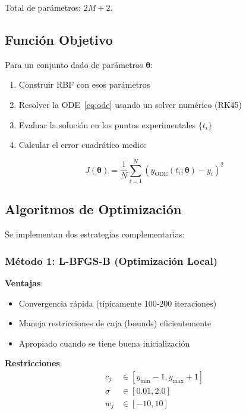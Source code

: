 \documentclass[11pt,a4paper]{article}
\begin{document}
Total de parámetros: $2M + 2$.

\subsection{Función Objetivo}

Para un conjunto dado de parámetros $\boldsymbol{\theta}$:

\begin{enumerate}
    \item Construir RBF con esos parámetros
    \item Resolver la ODE~\eqref{eq:ode} usando un solver numérico (RK45)
    \item Evaluar la solución en los puntos experimentales $\{t_i\}$
    \item Calcular el error cuadrático medio:
\end{enumerate}

\begin{equation}
J(\boldsymbol{\theta}) = \frac{1}{N}\sum_{i=1}^{N} \left( y_{\text{ODE}}(t_i; \boldsymbol{\theta}) - y_i \right)^2
\label{eq:objective}
\end{equation}

\subsection{Algoritmos de Optimización}

Se implementan dos estrategias complementarias:

\subsubsection{Método 1: L-BFGS-B (Optimización Local)}

\textbf{Ventajas}:
\begin{itemize}
    \item Convergencia rápida (típicamente 100-200 iteraciones)
    \item Maneja restricciones de caja (bounds) eficientemente
    \item Apropiado cuando se tiene buena inicialización
\end{itemize}

\textbf{Restricciones}:
\begin{align}
c_j &\in [y_{\min} - 1, y_{\max} + 1] \\
\sigma &\in [0.01, 2.0] \\
w_j &\in [-10, 10]
\end{align}
\end{document}
